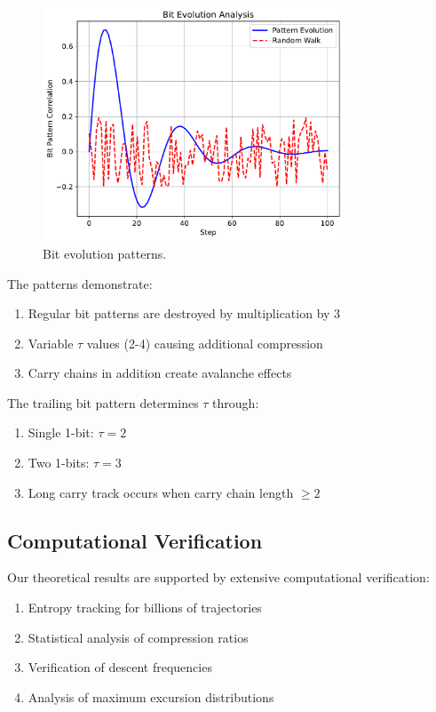 \begin{figure}[h]
\centering
\includegraphics[width=0.8\textwidth]{figures/bit_evolution.pdf}
\caption{Bit evolution patterns.}
\label{fig:bit_evolution}
\end{figure}

The patterns demonstrate:
\begin{enumerate}
\item Regular bit patterns are destroyed by multiplication by 3
\item Variable $\tau$ values (2-4) causing additional compression
\item Carry chains in addition create avalanche effects
\end{enumerate}

The trailing bit pattern determines $\tau$ through:
\begin{enumerate}
\item Single 1-bit: $\tau = 2$
\item Two 1-bits: $\tau = 3$
\item Long carry track occurs when carry chain length $\geq 2$
\end{enumerate}

\subsection{Computational Verification}

Our theoretical results are supported by extensive computational verification:
\begin{enumerate}
\item Entropy tracking for billions of trajectories
\item Statistical analysis of compression ratios
\item Verification of descent frequencies
\item Analysis of maximum excursion distributions
\end{enumerate}

